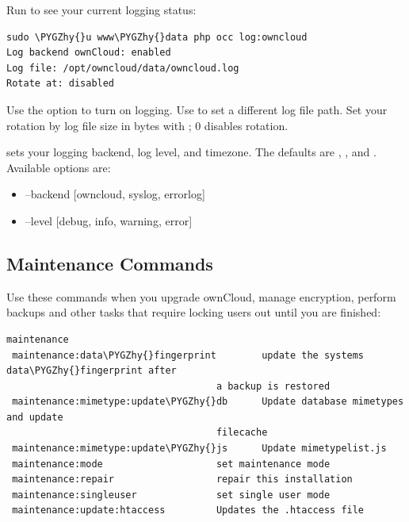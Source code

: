 \documentclass[letterpaper,10pt,english]{sphinxmanual}
\def\PYGZhy{\char`\-}
\begin{document}
Run  to see your current logging status:

\begin{Verbatim}[commandchars=\\\{\}]
sudo \PYGZhy{}u www\PYGZhy{}data php occ log:owncloud
Log backend ownCloud: enabled
Log file: /opt/owncloud/data/owncloud.log
Rotate at: disabled
\end{Verbatim}

Use the  option to turn on logging. Use  to set a
different log file path. Set your rotation by log file size in bytes with
; 0 disables rotation.

 sets your logging backend, log level, and timezone. The defaults
are , , and . Available options are:
\begin{itemize}
\item {} 
--backend {[}owncloud, syslog, errorlog{]}

\item {} 
--level {[}debug, info, warning, error{]}

\end{itemize}


\subsection{Maintenance Commands}
\label{configuration_server/occ_command:maintenance-commands}\label{configuration_server/occ_command:maintenance-commands-label}
Use these commands when you upgrade ownCloud, manage encryption, perform
backups and other tasks that require locking users out until you are finished:

\begin{Verbatim}[commandchars=\\\{\}]
maintenance
 maintenance:data\PYGZhy{}fingerprint        update the systems data\PYGZhy{}fingerprint after
                                     a backup is restored
 maintenance:mimetype:update\PYGZhy{}db      Update database mimetypes and update
                                     filecache
 maintenance:mimetype:update\PYGZhy{}js      Update mimetypelist.js
 maintenance:mode                    set maintenance mode
 maintenance:repair                  repair this installation
 maintenance:singleuser              set single user mode
 maintenance:update:htaccess         Updates the .htaccess file
\end{Verbatim}
\end{document}
